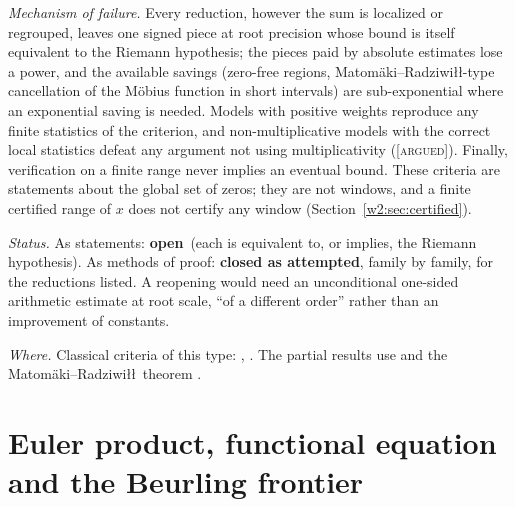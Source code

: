 \documentclass[11pt]{amsart}
\theoremstyle{definition}
\theoremstyle{remark}
\numberwithin{equation}{section}
\newcommand{\stag}[1]{\textsc{[#1]}}
\newcommand{\ARGUED}{\stag{argued}}
\newcommand{\rtag}[1]{\textbf{\small\textsf{#1}}}
\newcommand{\closedA}{\rtag{closed as attempted}}
\newcommand{\openR}{\rtag{open}}
\newcommand{\entry}[1]{\par\smallskip\noindent\textit{#1.}\enspace}
\begin{document}
\entry{Mechanism of failure} Every reduction, however the sum is localized or regrouped, leaves one signed
piece at root precision whose bound is itself equivalent to the Riemann hypothesis; the pieces paid by
absolute estimates lose a power, and the available savings (zero-free regions, Matom\"aki--Radziwi\l\l-type \cite{MatomakiRadziwill2016}
cancellation of the M\"obius function in short intervals) are sub-exponential where an exponential saving is
needed. Models with positive weights reproduce any finite statistics of the criterion, and non-multiplicative
models with the correct local statistics defeat any argument not using multiplicativity (\ARGUED). Finally,
verification on a finite range never implies an eventual bound. These criteria are statements about the
global set of zeros; they are not windows, and a finite certified range of $x$ does not certify any window
(Section~\ref{w2:sec:certified}).

\entry{Status} As statements: \openR\ (each is equivalent to, or implies, the Riemann hypothesis). As methods
of proof: \closedA, family by family, for the reductions listed. A reopening would need an unconditional
one-sided arithmetic estimate at root scale, ``of a different order'' rather than an improvement of constants.

\entry{Where} Classical criteria of this type: \cite[Ch.~V]{Ingham1932}, \cite[Ch.~XIV]{Titchmarsh1986}.
The partial results use \cite{Ford2002} and the Matom\"aki--Radziwi\l\l\ theorem \cite{MatomakiRadziwill2016}.


\section{Euler product, functional equation and the Beurling frontier}\label{w7:sec:euler}
\end{document}
